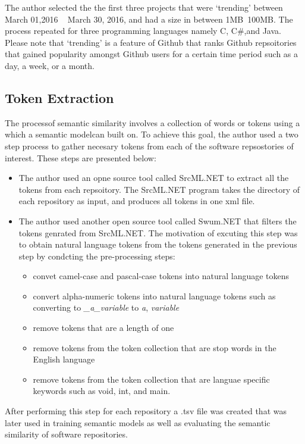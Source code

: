 \documentclass[conference]{IEEEtran}
\begin{document}
The author selected the the first three projects that were `trending' between March 01,2016 ~ March 30, 2016, and had a size in between 1MB~100MB. The process repeated for three programming languages namely C, C\#,and Java.  Please note that `trending' is a feature of Github that ranks Github repsoitories that gained popularity amongst Github users for a certain time period such as a day, a week, or a month. 

\subsection{Token Extraction}
\label{token_extract}

The processof semantic similarity involves a collection of words or tokens using a which a semantic modelcan built on. To achieve this goal, 
the author used a two step process to gather necesary tokens from each of the software repsostories of interest. These steps are presented below: 

\begin{itemize}
\item{The author used an opne source tool called SrcML.NET to extract all the tokens from each repsoitory. The SrcML.NET program takes the directory of each repository as input, and produces all tokens in one xml file.}

\item{The author used another open source tool called Swum.NET that filters the tokens genrated from SrcML.NET. The motivation of excuting this step was to obtain natural language tokens from the tokens generated in the previous step by condcting the pre-processing steps: 
\begin{itemize}
\item{convet camel-case and pascal-case tokens into natural language tokens}
\item{convert alpha-numeric tokens into natural language tokens such as converting to \textit{\_a\_variable} to \textit{a}, \textit{variable}}
\item{remove tokens that are a length of one }
\item{remove tokens from the token collection that are stop words in the English language}
\item{remove tokens from the token collection that are languae specific keywords such as void, int, and main. }
\end{itemize}
}
\end{itemize}

After performing this step for each repository a .tsv file was created that was later used in training semantic models as well as evaluating the semantic similarity of software repositories. 
\end{document}
